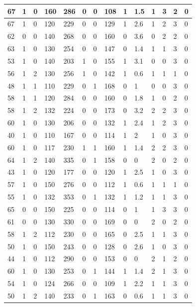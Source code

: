 \documentclass{article}
\begin{document}
\begin{table}[h!]
\begin{tabular}{|l|l|l|l|l|l|l|l|l|l|l|l|l|l|}
67 & 1 & 0 & 160 & 286 & 0 & 0 & 108 & 1 & 1.5 & 1  &3 & 2 & 0 \\ \hline
67 & 1 & 0 & 120 & 229 & 0 & 0 & 129 & 1 & 2.6 & 1  &2 & 3 & 0 \\ \hline
62 & 0 & 0 & 140 & 268 & 0 & 0 & 160 & 0 & 3.6 & 0  &2 & 2 & 0 \\ \hline
63 & 1 & 0 & 130 & 254 & 0 & 0 & 147 & 0 & 1.4 & 1  &1 & 3 & 0 \\ \hline
53 & 1 & 0 & 140 & 203 & 1 & 0 & 155 & 1 & 3.1 & 0  &0 & 3 & 0 \\ \hline
56 & 1 & 2 & 130 & 256 & 1 & 0 & 142 & 1 & 0.6 & 1  &1 & 1 & 0 \\ \hline
48 & 1 & 1 & 110 & 229 & 0 & 1 & 168 & 0 & 1 & 0  &0 & 3 & 0 \\ \hline
58 & 1 & 1 & 120 & 284 & 0 & 0 & 160 & 0 & 1.8 & 1  &0 & 2 & 0 \\ \hline
58 & 1 & 2 & 132 & 224 & 0 & 0 & 173 & 0 & 3.2 & 2  &2 & 3 & 0 \\ \hline
60 & 1 & 0 & 130 & 206 & 0 & 0 & 132 & 1 & 2.4 & 1  &2 & 3 & 0 \\ \hline
40 & 1 & 0 & 110 & 167 & 0 & 0 & 114 & 1 & 2 & 1  &0 & 3 & 0 \\ \hline
60 & 1 & 0 & 117 & 230 & 1 & 1 & 160 & 1 & 1.4 & 2  &2 & 3 & 0 \\ \hline
64 & 1 & 2 & 140 & 335 & 0 & 1 & 158 & 0 & 0 & 2  &0 & 2 & 0 \\ \hline
43 & 1 & 0 & 120 & 177 & 0 & 0 & 120 & 1 & 2.5 & 1  &0 & 3 & 0 \\ \hline
57 & 1 & 0 & 150 & 276 & 0 & 0 & 112 & 1 & 0.6 & 1  &1 & 1 & 0 \\ \hline
55 & 1 & 0 & 132 & 353 & 0 & 1 & 132 & 1 & 1.2 & 1  &1 & 3 & 0 \\ \hline
65 & 0 & 0 & 150 & 225 & 0 & 0 & 114 & 0 & 1 & 1  &3 & 3 & 0 \\ \hline
61 & 0 & 0 & 130 & 330 & 0 & 0 & 169 & 0 & 0 & 2  &0 & 2 & 0 \\ \hline
58 & 1 & 2 & 112 & 230 & 0 & 0 & 165 & 0 & 2.5 & 1  &1 & 3 & 0 \\ \hline
50 & 1 & 0 & 150 & 243 & 0 & 0 & 128 & 0 & 2.6 & 1  &0 & 3 & 0 \\ \hline
44 & 1 & 0 & 112 & 290 & 0 & 0 & 153 & 0 & 0 & 2  &1 & 2 & 0 \\ \hline
60 & 1 & 0 & 130 & 253 & 0 & 1 & 144 & 1 & 1.4 & 2  &1 & 3 & 0 \\ \hline
54 & 1 & 0 & 124 & 266 & 0 & 0 & 109 & 1 & 2.2 & 1  &1 & 3 & 0 \\ \hline
50 & 1 & 2 & 140 & 233 & 0 & 1 & 163 & 0 & 0.6 & 1  &1 & 3 & 0 \\ \hline

\end{tabular}
\end{table}
\end{document}
